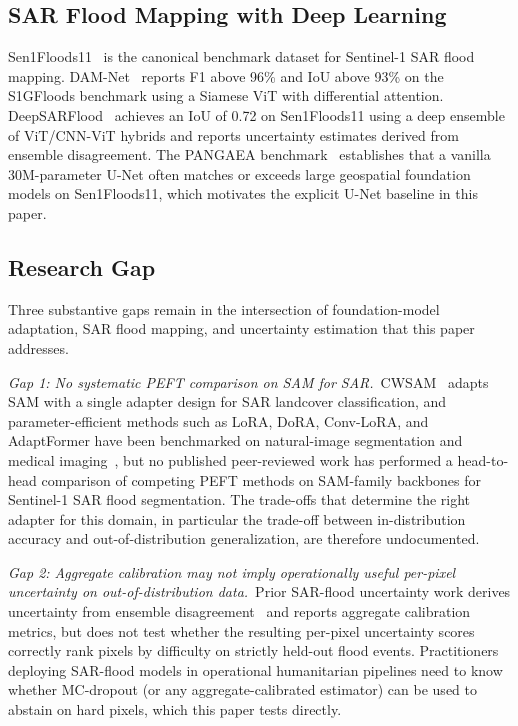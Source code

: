 \documentclass[conference]{IEEEtran}
\begin{document}
\subsection{SAR Flood Mapping with Deep Learning}

Sen1Floods11~\cite{Bonafilia2020Sen1Floods11} is the canonical benchmark dataset for Sentinel-1 SAR flood mapping. DAM-Net~\cite{Saleh2024DAMNet} reports F1 above 96\% and IoU above 93\% on the S1GFloods benchmark using a Siamese ViT with differential attention. DeepSARFlood~\cite{Sharma2025DeepSARFlood} achieves an IoU of 0.72 on Sen1Floods11 using a deep ensemble of ViT/CNN-ViT hybrids and reports uncertainty estimates derived from ensemble disagreement. The PANGAEA benchmark~\cite{Marsocci2024PANGAEA} establishes that a vanilla 30M-parameter U-Net often matches or exceeds large geospatial foundation models on Sen1Floods11, which motivates the explicit U-Net baseline in this paper.

\subsection{Research Gap}

Three substantive gaps remain in the intersection of foundation-model adaptation, SAR flood mapping, and uncertainty estimation that this paper addresses.

\textit{Gap 1: No systematic PEFT comparison on SAM for SAR.}~CWSAM~\cite{Pu2025CWSAM} adapts SAM with a single adapter design for SAR landcover classification, and parameter-efficient methods such as LoRA, DoRA, Conv-LoRA, and AdaptFormer have been benchmarked on natural-image segmentation and medical imaging~\cite{Hu2022LoRA,Liu2024DoRA,Zhong2024ConvLoRA,Chen2022AdaptFormer,Ma2024MedSAM}, but no published peer-reviewed work has performed a head-to-head comparison of competing PEFT methods on SAM-family backbones for Sentinel-1 SAR flood segmentation. The trade-offs that determine the right adapter for this domain, in particular the trade-off between in-distribution accuracy and out-of-distribution generalization, are therefore undocumented.

\textit{Gap 2: Aggregate calibration may not imply operationally useful per-pixel uncertainty on out-of-distribution data.}~Prior SAR-flood uncertainty work derives uncertainty from ensemble disagreement~\cite{Sharma2025DeepSARFlood} and reports aggregate calibration metrics, but does not test whether the resulting per-pixel uncertainty scores correctly rank pixels by difficulty on strictly held-out flood events. Practitioners deploying SAR-flood models in operational humanitarian pipelines need to know whether MC-dropout (or any aggregate-calibrated estimator) can be used to abstain on hard pixels, which this paper tests directly.
\end{document}
